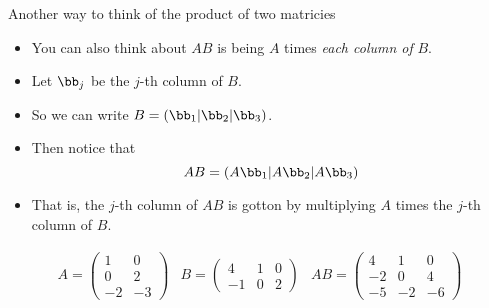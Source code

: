 \documentclass{beamer}
\begin{document}
\begin{frame}{Another way to think of the product of two matricies}

\begin{itemize}
\item You can also think about $A B$ is being $A$ times \emph{each column of} $B$.
\item Let $\bb_j$ be the $j$-th column of $B$.
\item So we can write $B = (\bb_1 \vert \bb_2 \vert \bb_3)$.

\item Then notice that
$$A B = (A\bb_1 \vert A\bb_2 \vert A\bb_3)$$

\item That is, the $j$-th column of $A B$ is gotton by multiplying $A$ times the $j$-th column of $B$.
\end{itemize}

$$
\begin{matrix}
A =

\begin{pmatrix}
1 & 0 \\
0 & 2 \\
-2 & -3
\end{pmatrix}

&

B =

\begin{pmatrix}
4  & 1 & 0 \\
-1 & 0 & 2
\end{pmatrix}

&

A B =

\begin{pmatrix}
4 & 1 & 0 \\
-2 & 0 & 4 \\
-5 & -2 & -6
\end{pmatrix}

\end{matrix}
$$

\end{frame}

\end{document}
